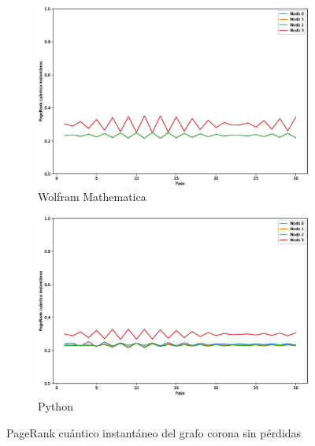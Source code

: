 \documentclass[xetex,mathserif,serif]{beamer}
\begin{document}
\begin{frame}
\begin{figure}[H]
    \centering
    \begin{subfigure}[m]{0.45\textwidth}
        \centering
        \includegraphics[width=0.9\linewidth]{img/crown-inst-M.eps}
        \caption{Wolfram Mathematica}
    \end{subfigure}
    \begin{subfigure}[m]{0.45\textwidth}
        \centering
        \includegraphics[width=0.9\linewidth]{img/crown-inst-lossless.eps}
        \caption{Python}
    \end{subfigure}
    \caption[PageRank cuántico instantáneo del grafo corona sin pérdidas]{PageRank cuántico instantáneo del grafo corona sin pérdidas}
    \label{fig:instcrownlossless}
\end{figure}


\end{frame}
\end{document}

